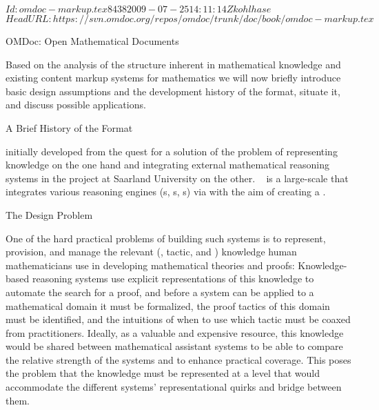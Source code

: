 \svnInfo $Id: omdoc-markup.tex 8438 2009-07-25 14:11:14Z kohlhase $
\svnKeyword $HeadURL: https://svn.omdoc.org/repos/omdoc/trunk/doc/book/omdoc-markup.tex $

\begin{omgroup}[id=omdoc-markup,short=Open Mathematical Documents]
                           {OMDoc: Open Mathematical Documents}

  Based on the analysis of the structure inherent in mathematical knowledge and existing
  content markup systems for mathematics we will now briefly introduce basic design
  assumptions and the development history of the {\omdoc} format, situate it, and discuss
  possible applications.

\begin{omgroup}[id=omdoc-history]{A Brief History of the {\omdoc} Format}

  {\omdoc} initially developed from the quest for a solution of the problem of
  representing knowledge on the one hand and integrating external mathematical reasoning
  systems in the {\OMEGA} project at Saarland University on the
  other. {\OMEGA}~\cite{OMEGA02} is a large-scale
  {} that integrates various reasoning engines
  ({s}, {s},
  {s}) via {}
  with the aim of creating a {}.

\begin{omgroup}[id=situating]{The Design Problem}
  
  One of the hard practical problems of building such systems is to represent, provision,
  and manage the relevant (, tactic, and
  ) knowledge human mathematicians use in
  developing mathematical theories and proofs: Knowledge-based reasoning systems use
  explicit representations of this knowledge to automate the search for a proof, and
  before a system can be applied to a mathematical domain it must be formalized, the proof
  tactics of this domain must be identified, and the intuitions of when to use which
  tactic must be coaxed from practitioners. Ideally, as a valuable and expensive resource,
  this knowledge would be shared between mathematical assistant systems to be able to
  compare the relative strength of the systems and to enhance practical coverage. This
  poses the problem that the knowledge must be represented at a level that would
  accommodate the different systems' representational quirks and bridge between them.


\end{omgroup}
\end{omgroup}
\end{omgroup}
